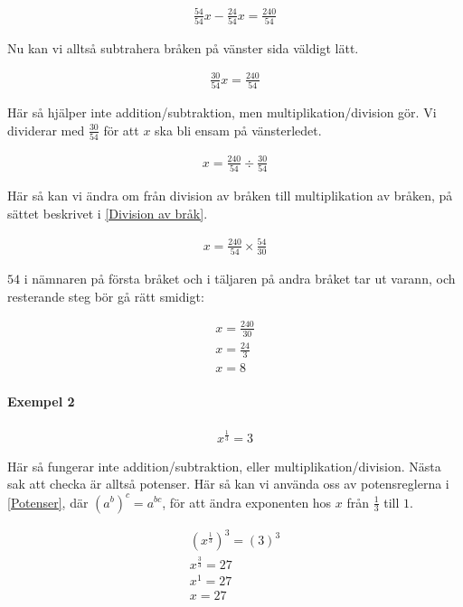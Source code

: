\begin{align*}
	\frac{54}{54}x - \frac{24}{54}x = \frac{240}{54}
\end{align*}

Nu kan vi alltså subtrahera bråken på vänster sida väldigt lätt.

\begin{align*}
	\frac{30}{54}x = \frac{240}{54}
\end{align*}

Här så hjälper inte addition/subtraktion, men multiplikation/division gör. Vi dividerar med $\frac{30}{54}$ för att $x$ ska bli ensam på vänsterledet.

\begin{align*}
	x = \frac{240}{54} \div \frac{30}{54}
\end{align*}

Här så kan vi ändra om från division av bråken till multiplikation av bråken, på sättet beskrivet i \ref{Division av bråk}.

\begin{align*}
	x = \frac{240}{54} \times \frac{54}{30}
\end{align*}

$54$ i nämnaren på första bråket och i täljaren på andra bråket tar ut varann, och resterande steg bör gå rätt smidigt:

\begin{align*}
	x = \frac{240}{30} \\
	x = \frac{24}{3} \\
	x = 8
\end{align*}

\paragraph{Exempel 2}

\begin{align*}
	x^{\frac{1}{3}} = 3
\end{align*}

Här så fungerar inte addition/subtraktion, eller multiplikation/division. Nästa sak att checka är alltså potenser. Här så kan vi använda oss av potensreglerna i \ref{Potenser}, där $(a^b)^c = a^{bc}$, för att ändra exponenten hos $x$ från $\frac{1}{3}$ till $1$.

\begin{align*}
	(x^{\frac{1}{3}})^{3} = (3)^3 \\
	x^{\frac{3}{3}} = 27 \\
	x^1 = 27 \\
	x = 27
\end{align*}


